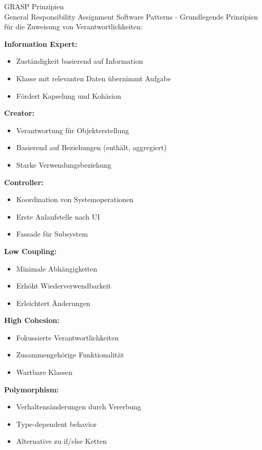 \begin{concept}{GRASP Prinzipien}\\
General Responsibility Assignment Software Patterns - Grundlegende Prinzipien für die Zuweisung von Verantwortlichkeiten:

\textbf{Information Expert:}
\begin{itemize}
    \item Zuständigkeit basierend auf Information
    \item Klasse mit relevanten Daten übernimmt Aufgabe
    \item Fördert Kapselung und Kohäsion
\end{itemize}

\textbf{Creator:}
\begin{itemize}
    \item Verantwortung für Objekterstellung
    \item Basierend auf Beziehungen (enthält, aggregiert)
    \item Starke Verwendungsbeziehung
\end{itemize}

\textbf{Controller:}
\begin{itemize}
    \item Koordination von Systemoperationen
    \item Erste Anlaufstelle nach UI
    \item Fassade für Subsystem
\end{itemize}

\textbf{Low Coupling:}
\begin{itemize}
    \item Minimale Abhängigkeiten
    \item Erhöht Wiederverwendbarkeit
    \item Erleichtert Änderungen
\end{itemize}

\textbf{High Cohesion:}
\begin{itemize}
    \item Fokussierte Verantwortlichkeiten
    \item Zusammengehörige Funktionalität
    \item Wartbare Klassen
\end{itemize}

\textbf{Polymorphism:}
\begin{itemize}
    \item Verhaltensänderungen durch Vererbung
    \item Type-dependent behavior
    \item Alternative zu if/else Ketten
\end{itemize}


\end{concept}

